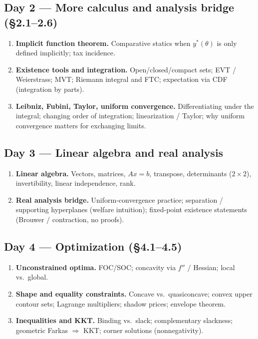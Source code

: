 \documentclass[11pt,a4paper]{article}
\begin{document}
\subsection*{Day 2 --- More calculus and analysis bridge (\S2.1--2.6)}
\begin{enumerate}
  \item \textbf{Implicit function theorem.} Comparative statics when $y^*(\theta)$ is only defined implicitly; tax incidence.
  \item \textbf{Existence tools and integration.} Open/closed/compact sets; EVT / Weierstrass; MVT; Riemann integral and FTC; expectation via CDF (integration by parts).
  \item \textbf{Leibniz, Fubini, Taylor, uniform convergence.} Differentiating under the integral; changing order of integration; linearization / Taylor; why uniform convergence matters for exchanging limits.
\end{enumerate}

\subsection*{Day 3 --- Linear algebra and real analysis}
\begin{enumerate}
  \item \textbf{Linear algebra.} Vectors, matrices, $Ax=b$, transpose, determinants ($2\times 2$), invertibility, linear independence, rank.
  \item \textbf{Real analysis bridge.} Uniform-convergence practice; separation / supporting hyperplanes (welfare intuition); fixed-point existence statements (Brouwer / contraction, no proofs).
\end{enumerate}

\subsection*{Day 4 --- Optimization (\S4.1--4.5)}
\begin{enumerate}
  \item \textbf{Unconstrained optima.} FOC/SOC; concavity via $f''$ / Hessian; local vs.\ global.
  \item \textbf{Shape and equality constraints.} Concave vs.\ quasiconcave; convex upper contour sets; Lagrange multipliers; shadow prices; envelope theorem.
  \item \textbf{Inequalities and KKT.} Binding vs.\ slack; complementary slackness; geometric Farkas $\Rightarrow$ KKT; corner solutions (nonnegativity).
\end{enumerate}
\end{document}
